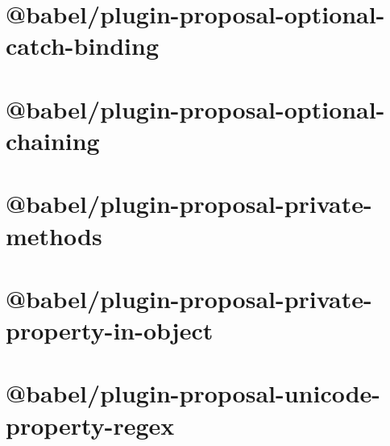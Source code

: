 \documentclass[twoside]{book}
\newcommand{\+}{\discretionary{\mbox{\scriptsize$\hookleftarrow$}}{}{}}
\begin{document}
\chapter{@babel/plugin-\/proposal-\/optional-\/catch-\/binding}
\label{md__c___users_vaishnavi_jadhav__desktop__developer_code_mean_stack_example_client_node_modules__77b7df588bbfdc0b068d5f92fe2182c8}

\chapter{@babel/plugin-\/proposal-\/optional-\/chaining}
\label{md__c___users_vaishnavi_jadhav__desktop__developer_code_mean_stack_example_client_node_modules__33e2fe896ff4ab7d8792d4a79d208e0c}

\chapter{@babel/plugin-\/proposal-\/private-\/methods}
\label{md__c___users_vaishnavi_jadhav__desktop__developer_code_mean_stack_example_client_node_modules__fb3a20256d9a900a90d7958c54415261}

\chapter{@babel/plugin-\/proposal-\/private-\/property-\/in-\/object}
\label{md__c___users_vaishnavi_jadhav__desktop__developer_code_mean_stack_example_client_node_modules__dfd515f9df93229d9af0581709bef195}

\chapter{@babel/plugin-\/proposal-\/unicode-\/property-\/regex}
\label{md__c___users_vaishnavi_jadhav__desktop__developer_code_mean_stack_example_client_node_modules__76ce47b068a46cea70a9f45cfa1b57fc}

\end{document}
